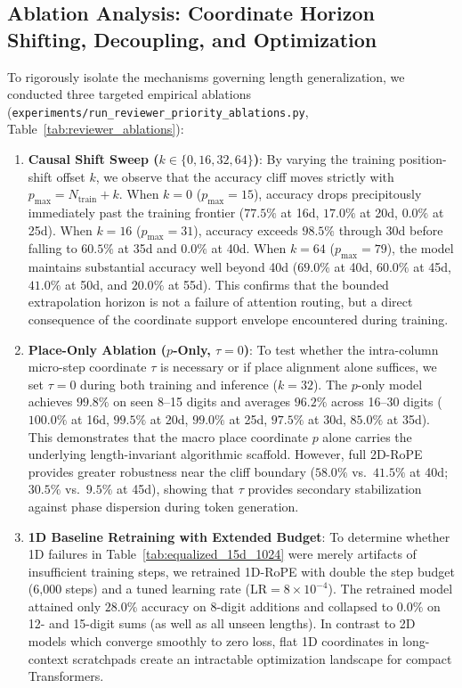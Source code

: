 \documentclass[10pt,twocolumn]{article}
\begin{document}
\subsection{Ablation Analysis: Coordinate Horizon Shifting, Decoupling, and Optimization}
\label{sec:reviewer_priority_ablations}

To rigorously isolate the mechanisms governing length generalization, we conducted three targeted empirical ablations (\texttt{experiments/run\_reviewer\_priority\_ablations.py}, Table~\ref{tab:reviewer_ablations}):
\begin{enumerate}[leftmargin=*,nosep]
    \item \textbf{Causal Shift Sweep ($k \in \{0, 16, 32, 64\}$)}: By varying the training position-shift offset $k$, we observe that the accuracy cliff moves strictly with $p_{\max} = N_{\text{train}} + k$. When $k=0$ ($p_{\max}=15$), accuracy drops precipitously immediately past the training frontier ($77.5\%$ at 16d, $17.0\%$ at 20d, $0.0\%$ at 25d). When $k=16$ ($p_{\max}=31$), accuracy exceeds $98.5\%$ through 30d before falling to $60.5\%$ at 35d and $0.0\%$ at 40d. When $k=64$ ($p_{\max}=79$), the model maintains substantial accuracy well beyond 40d ($69.0\%$ at 40d, $60.0\%$ at 45d, $41.0\%$ at 50d, and $20.0\%$ at 55d). This confirms that the bounded extrapolation horizon is not a failure of attention routing, but a direct consequence of the coordinate support envelope encountered during training.
    \item \textbf{Place-Only Ablation ($p$-Only, $\tau=0$)}: To test whether the intra-column micro-step coordinate $\tau$ is necessary or if place alignment alone suffices, we set $\tau=0$ during both training and inference ($k=32$). The $p$-only model achieves $99.8\%$ on seen 8--15 digits and averages $96.2\%$ across 16--30 digits ($100.0\%$ at 16d, $99.5\%$ at 20d, $99.0\%$ at 25d, $97.5\%$ at 30d, $85.0\%$ at 35d). This demonstrates that the macro place coordinate $p$ alone carries the underlying length-invariant algorithmic scaffold. However, full 2D-RoPE provides greater robustness near the cliff boundary ($58.0\%$ vs.\ $41.5\%$ at 40d; $30.5\%$ vs.\ $9.5\%$ at 45d), showing that $\tau$ provides secondary stabilization against phase dispersion during token generation.
    \item \textbf{1D Baseline Retraining with Extended Budget}: To determine whether 1D failures in Table~\ref{tab:equalized_15d_1024} were merely artifacts of insufficient training steps, we retrained 1D-RoPE with double the step budget (6,000 steps) and a tuned learning rate ($\mathrm{LR}=8\times 10^{-4}$). The retrained model attained only $28.0\%$ accuracy on 8-digit additions and collapsed to $0.0\%$ on 12- and 15-digit sums (as well as all unseen lengths). In contrast to 2D models which converge smoothly to zero loss, flat 1D coordinates in long-context scratchpads create an intractable optimization landscape for compact Transformers.
\end{enumerate}
\end{document}
